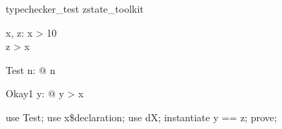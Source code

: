 \begin{zsection}
   \SECTION typechecker\_test \parents zstate\_toolkit
\end{zsection}

\begin{axdef}
   x, z: \nat
\where
    x > 10
   \\
    z > x
\end{axdef}

\begin{theorem}{Test}
    \forall n: \nat @ n 
\end{theorem}

\begin{theorem}{Okay1}
    \exists y: \nat @ y > x
\end{theorem}

\begin{zproof}[Okay1]
   use Test;
   use x\$declaration;
   use dX;
   instantiate y == z;
   prove;
\end{zproof}